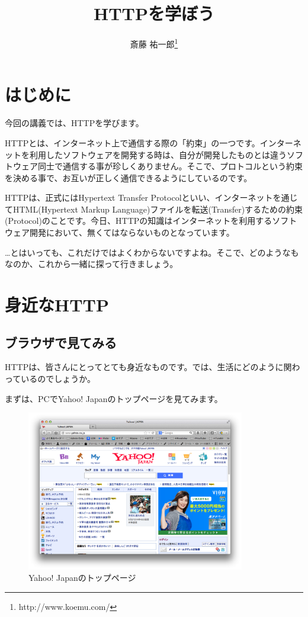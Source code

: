 \documentclass[a4j,11pt,openany]{jsbook}
\begin{document}
\title{HTTPを学ぼう}
\author{斎藤 祐一郎\footnote{http://www.koemu.com/}}
\maketitle

\tableofcontents

\newpage


\chapter{はじめに\label{hajimeni}}

今回の講義では、HTTP\cite{RFC2616}を学びます。

HTTPとは、インターネット上で通信する際の「約束」の一つです。インターネットを利用したソフトウェアを開発する時は、自分が開発したものとは違うソフトウェア同士で通信する事が珍しくありません。そこで、プロトコルという約束を決める事で、お互いが正しく通信できるようにしているのです。

HTTPは、正式にはHypertext Transfer Protocolといい、インターネットを通じてHTML(Hypertext Markup Language\cite{RFC1866})ファイルを転送(Transfer)するための約束(Protocol)のことです。今日、HTTPの知識はインターネットを利用するソフトウェア開発において、無くてはならないものとなっています。

…とはいっても、これだけではよくわからないですよね。そこで、どのようなもなのか、これから一緒に探って行きましょう。

\chapter{身近なHTTP}

\section{ブラウザで見てみる}

HTTPは、皆さんにとってとても身近なものです。では、生活にどのように関わっているのでしょうか。

まずは、PCでYahoo! Japanのトップページを見てみます。

\begin{figure}[h]
    \begin{center}
        \includegraphics[height=7cm]{./yahoo_pc.png}
        \caption{Yahoo! Japanのトップページ}
        \label{yahoo_pc}
    \end{center}
\end{figure}
\end{document}
